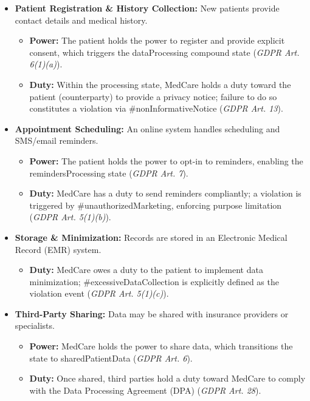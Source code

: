 \begin{itemize}

    \item \textbf{Patient Registration \& History Collection:}  
    New patients provide contact details and medical history.
    \begin{itemize}
        \item \textbf{Power:} The patient holds the power to register and provide explicit consent, which triggers the dataProcessing compound state (\textit{GDPR Art. 6(1)(a)}).
        \item \textbf{Duty:} Within the processing state, MedCare holds a duty toward the patient (counterparty) to provide a privacy notice; failure to do so constitutes a violation via \#nonInformativeNotice (\textit{GDPR Art. 13}).
    \end{itemize}

    \item \textbf{Appointment Scheduling:}  
    An online system handles scheduling and SMS/email reminders.
    \begin{itemize}
        \item \textbf{Power:} The patient holds the power to opt-in to reminders, enabling the remindersProcessing state (\textit{GDPR Art. 7}).
        \item \textbf{Duty:} MedCare has a duty to send reminders compliantly; a violation is triggered by \#unauthorizedMarketing, enforcing purpose limitation (\textit{GDPR Art. 5(1)(b)}).
    \end{itemize}

    \item \textbf{Storage \& Minimization:}  
    Records are stored in an Electronic Medical Record (EMR) system.
    \begin{itemize}
        \item \textbf{Duty:} MedCare owes a duty to the patient to implement data minimization; \#excessiveDataCollection is explicitly defined as the violation event (\textit{GDPR Art. 5(1)(c)}).
    \end{itemize}

    \item \textbf{Third-Party Sharing:}  
    Data may be shared with insurance providers or specialists.
    \begin{itemize}
        \item \textbf{Power:} MedCare holds the power to share data, which transitions the state to sharedPatientData (\textit{GDPR Art. 6}).
        \item \textbf{Duty:} Once shared, third parties hold a duty toward MedCare to comply with the Data Processing Agreement (DPA) (\textit{GDPR Art. 28}).
    \end{itemize}


\end{itemize}
